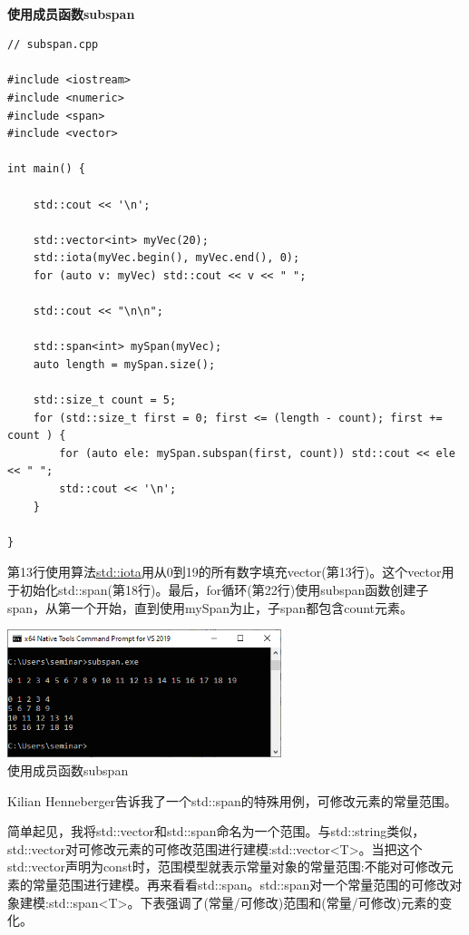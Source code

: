 \hspace*{\fill} \\ %
\noindent
\textbf{使用成员函数subspan}
\begin{lstlisting}[style=styleCXX]
// subspan.cpp

#include <iostream>
#include <numeric>
#include <span>
#include <vector>

int main() {

	std::cout << '\n';
	
	std::vector<int> myVec(20);
	std::iota(myVec.begin(), myVec.end(), 0);
	for (auto v: myVec) std::cout << v << " ";
	
	std::cout << "\n\n";
	
	std::span<int> mySpan(myVec);
	auto length = mySpan.size();
	
	std::size_t count = 5;
	for (std::size_t first = 0; first <= (length - count); first += count ) {
		for (auto ele: mySpan.subspan(first, count)) std::cout << ele << " ";
		std::cout << '\n';
	}

}
\end{lstlisting}

第13行使用算法\href{https://en.cppreference.com/w/cpp/algorithm/iota}{std::iota}用从0到19的所有数字填充vector(第13行)。这个vector用于初始化std::span(第18行)。最后，for循环(第22行)使用subspan函数创建子span，从第一个开始，直到使用mySpan为止，子span都包含count元素。

\begin{center}
\includegraphics[width=0.6\textwidth]{content/3/chapter5/images/8.png}\\
使用成员函数subspan
\end{center}

Kilian Henneberger告诉我了一个std::span的特殊用例，可修改元素的常量范围。


简单起见，我将std::vector和std::span命名为一个范围。与std::string类似，std::vector对可修改元素的可修改范围进行建模:std::vector<T>。当把这个std::vector声明为const时，范围模型就表示常量对象的常量范围:不能对可修改元素的常量范围进行建模。再来看看std::span。std::span对一个常量范围的可修改对象建模:std::span<T>。下表强调了(常量/可修改)范围和(常量/可修改)元素的变化。

